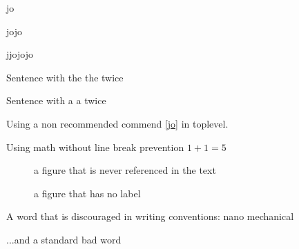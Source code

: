 
jo

jojo

jjojojo

Sentence with the the twice

Sentence with a a twice

Using a non recommended commend \ref{jo} in toplevel.

Using math without line break prevention $1+1=5$

\begin{figure}
  \caption{a figure that is never referenced in the text}
  \label{fig:thefigure}
\end{figure}

\begin{figure}
  \caption{a figure that has no label}
\end{figure}

A word that is discouraged in writing conventions: nano mechanical

...and a standard bad word 


